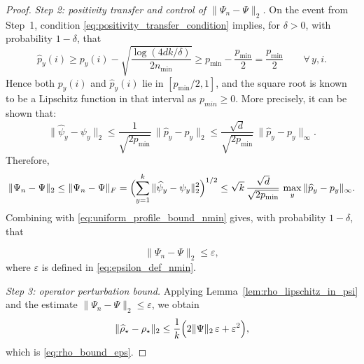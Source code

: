\documentclass[preprint,11pt]{elsarticle}
\newcommand{\xr}[1]{{ \color{orange}{[XR - #1]}}}
\begin{document}
\begin{proof}
\medskip
\noindent\emph{Step 2: positivity transfer and control of $\|\Psi_n-\Psi\|_2$.}
On the event from Step~1, condition \eqref{eq:positivity_transfer_condition} implies, for $\delta >0$, with probability $1-\delta$, that
\[
\widehat p_y(i)\ge p_y(i)-\sqrt{\frac{\log(4dk/\delta)}{2n_{\min}}}
\ge p_{\min}-\frac{p_{\min}}{2}
=\frac{p_{\min}}{2}
\qquad \forall\, y,i.
\]
Hence both $p_y(i)$ and $\widehat p_y(i)$ lie in $[p_{\min}/2,1]$, and the square root is known to be a Lipschitz function \cite{rudin1976principles} in that interval as $p_{min} \geq 0$. More precisely, it can be shown that: 
\[
\|\widehat\psi_y-\psi_y\|_2
\le
\frac{1}{\sqrt{2p_{\min}}}\,\|\widehat p_y-p_y\|_2
\le
\frac{\sqrt d}{\sqrt{2p_{\min}}}\,\|\widehat p_y-p_y\|_\infty.
\]
Therefore,
\[
\|\Psi_n-\Psi\|_2
\le
\|\Psi_n-\Psi\|_F
=
\Bigl(\sum_{y=1}^k \|\widehat\psi_y-\psi_y\|_2^2\Bigr)^{1/2}
\le
\sqrt{k}\,\frac{\sqrt d}{\sqrt{2p_{\min}}}\,\max_y\|\widehat p_y-p_y\|_\infty.
\]
Combining with \eqref{eq:uniform_profile_bound_nmin} gives, with probability $1 - \delta$, that

\[
\|\Psi_n-\Psi\|_2 \le \varepsilon,
\]
where $\varepsilon$ is defined in \eqref{eq:epsilon_def_nmin}.

\medskip
\noindent\emph{Step 3: operator perturbation bound.}
Applying Lemma~\ref{lem:rho_lipschitz_in_psi} and the estimate $\|\Psi_n-\Psi\|_2\le \varepsilon$, we obtain
\[
\|\widehat\rho_\star-\rho_\star\|_2
\le
\frac{1}{k}\Bigl(2\|\Psi\|_2\,\varepsilon+\varepsilon^2\Bigr),
\]
which is \eqref{eq:rho_bound_eps}.
\end{proof}
\end{document}
